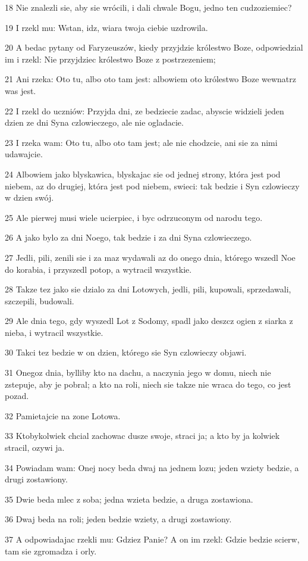 \par 18 Nie znalezli sie, aby sie wrócili, i dali chwale Bogu, jedno ten cudzoziemiec?
\par 19 I rzekl mu: Wstan, idz, wiara twoja ciebie uzdrowila.
\par 20 A bedac pytany od Faryzeuszów, kiedy przyjdzie królestwo Boze, odpowiedzial im i rzekl: Nie przyjdziec królestwo Boze z postrzezeniem;
\par 21 Ani rzeka: Oto tu, albo oto tam jest: albowiem oto królestwo Boze wewnatrz was jest.
\par 22 I rzekl do uczniów: Przyjda dni, ze bedziecie zadac, abyscie widzieli jeden dzien ze dni Syna czlowieczego, ale nie ogladacie.
\par 23 I rzeka wam: Oto tu, albo oto tam jest; ale nie chodzcie, ani sie za nimi udawajcie.
\par 24 Albowiem jako blyskawica, blyskajac sie od jednej strony, która jest pod niebem, az do drugiej, która jest pod niebem, swieci: tak bedzie i Syn czlowieczy w dzien swój.
\par 25 Ale pierwej musi wiele ucierpiec, i byc odrzuconym od narodu tego.
\par 26 A jako bylo za dni Noego, tak bedzie i za dni Syna czlowieczego.
\par 27 Jedli, pili, zenili sie i za maz wydawali az do onego dnia, którego wszedl Noe do korabia, i przyszedl potop, a wytracil wszystkie.
\par 28 Takze tez jako sie dzialo za dni Lotowych, jedli, pili, kupowali, sprzedawali, szczepili, budowali.
\par 29 Ale dnia tego, gdy wyszedl Lot z Sodomy, spadl jako deszcz ogien z siarka z nieba, i wytracil wszystkie.
\par 30 Takci tez bedzie w on dzien, którego sie Syn czlowieczy objawi.
\par 31 Onegoz dnia, bylliby kto na dachu, a naczynia jego w domu, niech nie zstepuje, aby je pobral; a kto na roli, niech sie takze nie wraca do tego, co jest pozad.
\par 32 Pamietajcie na zone Lotowa.
\par 33 Ktobykolwiek chcial zachowac dusze swoje, straci ja; a kto by ja kolwiek stracil, ozywi ja.
\par 34 Powiadam wam: Onej nocy beda dwaj na jednem lozu; jeden wziety bedzie, a drugi zostawiony.
\par 35 Dwie beda mlec z soba; jedna wzieta bedzie, a druga zostawiona.
\par 36 Dwaj beda na roli; jeden bedzie wziety, a drugi zostawiony.
\par 37 A odpowiadajac rzekli mu: Gdziez Panie? A on im rzekl: Gdzie bedzie scierw, tam sie zgromadza i orly.

